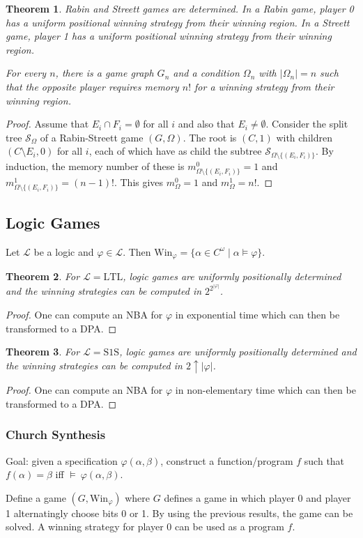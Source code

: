 \documentclass{article}
\newtheorem{theorem}{Theorem}
\begin{document}
\begin{theorem}
	Rabin and Streett games are determined. In a Rabin game, player 0 has a uniform positional winning strategy from their winning region. In a Streett game, player 1 has a uniform positional winning strategy from their winning region. 
	
	For every $n$, there is a game graph $G_n$ and a condition $\Omega_n$ with $|\Omega_n| = n$ such that the opposite player requires memory $n!$ for a winning strategy from their winning region.
\end{theorem}
\begin{proof}
	Assume that $E_i \cap F_i = \emptyset$ for all $i$ and also that $E_i \neq \emptyset$. Consider the split tree $\mathcal{S}_\Omega$ of a Rabin-Streett game $(G, \Omega)$. The root is $(C, 1)$ with children $(C \setminus E_i, 0)$ for all $i$, each of which have as child the subtree $\mathcal{S}_{\Omega \setminus \{(E_i, F_i)\}}$. By induction, the memory number of these is $m_{\Omega \setminus \{(E_i, F_i)\}}^0 = 1$ and $m_{\Omega \setminus \{(E_i, F_i)\}}^1 = (n-1)!$. This gives $m^0_\Omega = 1$ and $m^1_\Omega = n!$.
\end{proof}

\vspace{1.5cm}
\subsection{Logic Games}
Let $\mathcal{L}$ be a logic and $\varphi \in \mathcal{L}$. Then $\text{Win}_\varphi = \{ \alpha \in C^\omega \mid \alpha \models \varphi \}$.

\begin{theorem}
	For $\mathcal{L} = \text{LTL}$, logic games are uniformly positionally determined and the winning strategies can be computed in $2^{2^{|\varphi|}}$.
\end{theorem}
\begin{proof}
	One can compute an NBA for $\varphi$ in exponential time which can then be transformed to a DPA.
\end{proof}

\begin{theorem}
	For $\mathcal{L} = \text{S1S}$, logic games are uniformly positionally determined and the winning strategies can be computed in $2 \uparrow |\varphi|$.
\end{theorem}
\begin{proof}
	One can compute an NBA for $\varphi$ in non-elementary time which can then be transformed to a DPA.
\end{proof}

\subsubsection{Church Synthesis}
Goal: given a specification $\varphi(\alpha, \beta)$, construct a function/program $f$ such that $f(\alpha) = \beta $ iff $\models~\varphi(\alpha, \beta)$.

Define a game $(G, \text{Win}_\varphi)$ where $G$ defines a game in which player 0 and player 1 alternatingly choose bits 0 or 1. By using the previous results, the game can be solved. A winning strategy for player 0 can be used as a program $f$.
\end{document}
